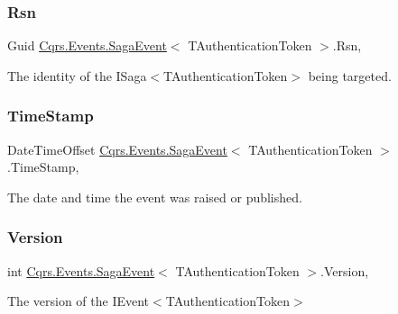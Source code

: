 \subsubsection{\texorpdfstring{Rsn}{Rsn}}
{\footnotesize\ttfamily Guid \hyperlink{classCqrs_1_1Events_1_1SagaEvent}{Cqrs.\+Events.\+Saga\+Event}$<$ T\+Authentication\+Token $>$.Rsn\hspace{0.3cm}{\ttfamily [get]}, {\ttfamily [set]}}



The identity of the I\+Saga$<$\+T\+Authentication\+Token$>$ being targeted. 

\mbox{\label{classCqrs_1_1Events_1_1SagaEvent_a6e522969d3456b62fe4291c5abc7e888_a6e522969d3456b62fe4291c5abc7e888}} 
\subsubsection{\texorpdfstring{Time\+Stamp}{TimeStamp}}
{\footnotesize\ttfamily Date\+Time\+Offset \hyperlink{classCqrs_1_1Events_1_1SagaEvent}{Cqrs.\+Events.\+Saga\+Event}$<$ T\+Authentication\+Token $>$.Time\+Stamp\hspace{0.3cm}{\ttfamily [get]}, {\ttfamily [set]}}



The date and time the event was raised or published. 

\mbox{\label{classCqrs_1_1Events_1_1SagaEvent_a4918d2e0a66897600143f1e645a0f136_a4918d2e0a66897600143f1e645a0f136}} 
\subsubsection{\texorpdfstring{Version}{Version}}
{\footnotesize\ttfamily int \hyperlink{classCqrs_1_1Events_1_1SagaEvent}{Cqrs.\+Events.\+Saga\+Event}$<$ T\+Authentication\+Token $>$.Version\hspace{0.3cm}{\ttfamily [get]}, {\ttfamily [set]}}



The version of the I\+Event$<$\+T\+Authentication\+Token$>$ 


